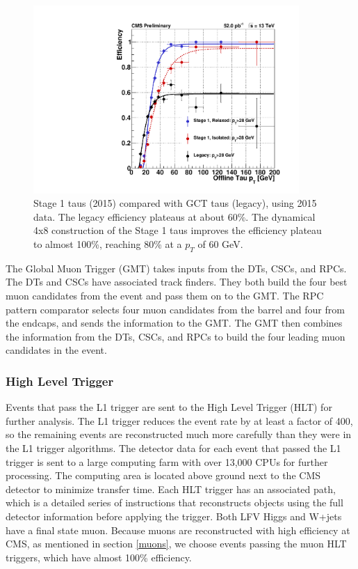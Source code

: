\documentclass[oneside, letterpaper, oldfontcommands]{memoir}
\begin{document}
\begin{figure}[here]
\includegraphics[width=0.9\textwidth]{TDR_RlxIsoLegacy_28GeV.pdf}
\caption{Stage 1 taus (2015) compared with GCT taus (legacy), using 2015 data. The legacy efficiency plateaus at about 60\%. The dynamical 4x8 construction of the Stage 1 taus improves the efficiency plateau to almost 100\%, reaching 80\% at a $p_{T}$ of 60 GeV.}
\label{fig:2012to2015taus}
\end{figure}

\qquad The Global Muon Trigger (GMT) takes inputs from the DTs, CSCs, and RPCs. The DTs and CSCs have associated track finders. They both build the four best muon candidates from the event and pass them on to the GMT. The RPC pattern comparator selects four muon candidates from the barrel and four from the endcaps, and sends the information to the GMT. The GMT then combines the information from the DTs, CSCs, and RPCs to build the four leading muon candidates in the event. 

\subsubsection{High Level Trigger}
\qquad Events that pass the L1 trigger are sent to the High Level Trigger (HLT) for further analysis. The L1 trigger reduces the event rate by at least a factor of 400, so the remaining events are reconstructed much more carefully than they were in the L1 trigger algorithms. The detector data for each event that passed the L1 trigger is sent to a large computing farm with over 13,000 CPUs for further processing. The computing area is located above ground next to the CMS detector to minimize transfer time. Each HLT trigger has an associated path, which is a detailed series of instructions that reconstructs objects using the full detector information before applying the trigger. Both LFV Higgs and W+jets have a final state muon. Because muons are reconstructed with high efficiency at CMS, as mentioned in section \ref{muons}, we choose events passing the muon HLT triggers, which have almost 100\% efficiency.
\end{document}
